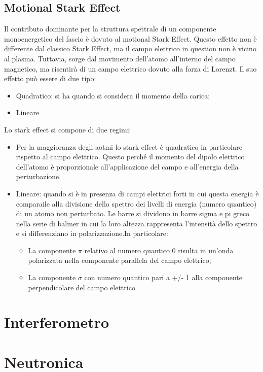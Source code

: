 \documentclass{article}
\begin{document}
\subsection{Motional Stark Effect}
Il contributo dominante per la struttura spettrale di un componente monoenergetico del fascio è dovuto al motional Stark Effect. Questo effetto non è differente dal classico Stark Effect, ma il campo elettrico in question non è vicino al plasma. Tuttavia, sorge dal movimento dell'atomo all'interno del campo magnetico, ma risentirà di un campo elettrico dovuto alla forza di Lorenzt.\newline
Il suo effetto può essere di due tipo:\begin{itemize}
    \item Quadratico: si ha quando si considera il momento della carica;
    \item Lineare
\end{itemize}
Lo stark effect si compone di due regimi:\begin{itemize}
    \item Per la maggioranza degli aotmi lo stark effect è quadratico in particolare rispetto al campo elettrico. Questo perché il momento del dipolo elettrico dell'atomo è proporzionale all'applicazione del campo e all'energia della perturbazione.
    \item Lineare: quando si è in presenza di campi elettrici forti in cui questa energia è comparaile alla divisione dello spettro dei livelli di energia (numero quantico) di un atomo non perturbato. Le barre si dividono in barre sigma e pi greco nella serie di balmer in cui la loro altezza rappresenta l'intensità dello spettro e si differenziano in polarizzazione.In particolare:\begin{itemize}
        \item La componente \(\pi \) relativo al numero quantico 0 risulta in un'onda polarizzata nella componente parallela del campo elettrico;
        \item La componente \(\sigma \) con numero quantico pari a +/- 1 alla componente perpendicolare del campo elettrico
    \end{itemize}
\end{itemize}


\section{Interferometro}

\section{Neutronica}
\end{document}
